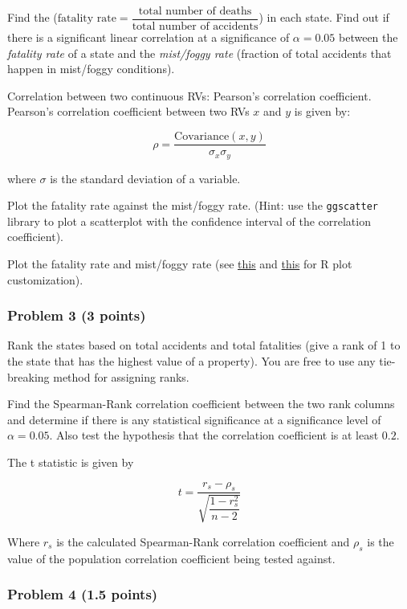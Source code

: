 \documentclass[
]{article}
\begin{document}
Find the
(\(\text{fatality rate} = \dfrac{\text{total number of deaths}}{\text{total number of accidents}}\))
in each state. Find out if there is a significant linear correlation at
a significance of \(\alpha=0.05\) between the \emph{fatality rate} of a
state and the \emph{mist/foggy rate} (fraction of total accidents that
happen in mist/foggy conditions).

Correlation between two continuous RVs: Pearson's correlation
coefficient. Pearson's correlation coefficient between two RVs \(x\) and
\(y\) is given by:

\[
  \rho = \frac{\text{Covariance}(x, y)}{\sigma_x \sigma_y}
\]

where \(\sigma\) is the standard deviation of a variable.

Plot the fatality rate against the mist/foggy rate. (Hint: use the
\texttt{ggscatter} library to plot a scatterplot with the confidence
interval of the correlation coefficient).

Plot the fatality rate and mist/foggy rate (see
\href{https://r-graph-gallery.com/13-scatter-plot.html}{this} and
\href{https://r-graph-gallery.com/6-graph-parameters-reminder.html}{this}
for R plot customization).

\hypertarget{problem-3-3-points}{%
\subsubsection{Problem 3 (3 points)}\label{problem-3-3-points}}

Rank the states based on total accidents and total fatalities (give a
rank of 1 to the state that has the highest value of a property). You
are free to use any tie-breaking method for assigning ranks.

Find the Spearman-Rank correlation coefficient between the two rank
columns and determine if there is any statistical significance at a
significance level of \(\alpha=0.05\). Also test the hypothesis that the
correlation coefficient is at least \(0.2\).

The t statistic is given by

\[
t = \dfrac{r_s - \rho_s}{\sqrt{\dfrac{1-r_s^2}{n-2}}}
\]

Where \(r_s\) is the calculated Spearman-Rank correlation coefficient
and \(\rho_s\) is the value of the population correlation coefficient
being tested against.

\hypertarget{problem-4-1.5-points}{%
\subsubsection{Problem 4 (1.5 points)}\label{problem-4-1.5-points}}
\end{document}
